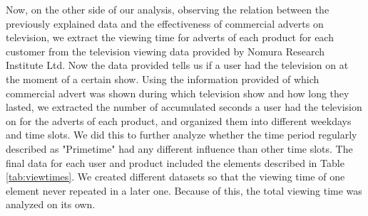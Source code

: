 \documentclass[review]{elsarticle}
\begin{document}
Now, on the other side of our analysis, observing the relation between the previously explained data and the effectiveness of commercial adverts on television, we extract the viewing time for adverts of each product for each customer from the television viewing data provided by Nomura Research Institute Ltd. Now the data provided tells us if a user had the television on at the moment of a certain show. Using the information provided of which commercial advert was shown during which television show and how long they lasted, we extracted the number of accumulated seconds a user had the television on for the adverts of each product, and organized them into different weekdays and time slots. We did this to further analyze whether the time period regularly described as "Primetime" had any different influence than other time slots. The final data for each user and product included the elements described in Table \ref{tab:viewtimes}. We created different datasets so that the viewing time of one element never repeated in a later one. Because of this, the total viewing time was analyzed on its own.
\end{document}

